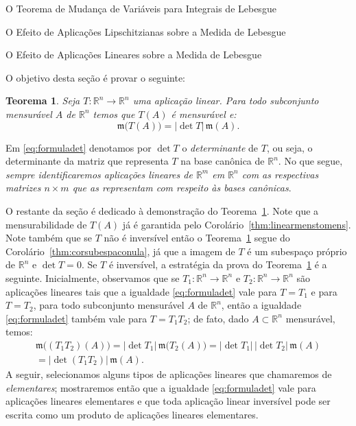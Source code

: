 \documentclass[oneside,final,11pt]{amsbook}
\newcommand{\R}{\mathds R}
\newcommand{\leb}{\mathfrak m}
\theoremstyle{remark}\newtheorem{exercise}{Exercício}[chapter]
\theoremstyle{remark}\newtheorem{*exercise}[exercise]{\hbox to 0pt{\hskip 0pt minus 1fil*}Exercício}
\theoremstyle{definition}\newtheorem{exdefin}{Definição}[chapter]
\theoremstyle{plain}\newtheorem{teo}{Teorema}[section]
\theoremstyle{plain}\newtheorem{lem}[teo]{Lema}
\theoremstyle{plain}\newtheorem{prop}[teo]{Proposição}
\theoremstyle{plain}\newtheorem{cor}[teo]{Corolário}
\theoremstyle{definition}\newtheorem{defin}[teo]{Definição}
\theoremstyle{remark}\newtheorem{rem}[teo]{Observação}
\theoremstyle{definition}\newtheorem{notation}[teo]{Notação}
\theoremstyle{definition}\newtheorem{convention}[teo]{Convenção}
\theoremstyle{definition}\newtheorem{example}[teo]{Exemplo}
\numberwithin{section}{chapter}
\numberwithin{equation}{section}
\begin{document}
\begin{chapter}{O Teorema de Mudança de Variáveis para Integrais de Lebesgue}
\begin{section}{O Efeito de Aplicações Lipschitzianas sobre a Medida de Lebesgue}
\end{section}

\begin{section}{O Efeito de Aplicações Lineares sobre a Medida de Lebesgue}

O objetivo desta seção é provar o seguinte:
\begin{teo}\label{thm:mudvarcasolin}
Seja $T:\R^n\to\R^n$ uma aplicação linear. Para todo subconjunto mensurável $A$ de $\R^n$
temos que $T(A)$ é mensurável e:
\begin{equation}\label{eq:formuladet}
\leb\big(T(A)\big)=\vert\det T\vert\,\leb(A).
\end{equation}
\end{teo}
Em \eqref{eq:formuladet} denotamos por $\det T$ o {\em determinante\/} de $T$, ou seja,
o determinante da matriz que representa $T$ na base canônica de $\R^n$. No que segue, {\em sempre identificaremos
aplicações lineares de $\R^m$ em $\R^n$ com as respectivas matrizes $n\times m$ que as representam com respeito às bases
canônicas}.

O restante da seção é dedicado à demonstração do Teorema~\ref{thm:mudvarcasolin}.
Note que a mensurabilidade de $T(A)$ já é garantida pelo Corolário~\ref{thm:linearmenstomens}.
Note também que se $T$ não é inversível então o Teorema~\ref{thm:mudvarcasolin} segue do Corolário~\ref{thm:corsubespaconula},
já que a imagem de $T$ é um subespaço próprio de $\R^n$ e $\det T=0$.
Se $T$ é inversível, a estratégia da prova
do Teorema~\ref{thm:mudvarcasolin} é a seguinte. Inicialmente, observamos que se $T_1:\R^n\to\R^n$ e $T_2:\R^n\to\R^n$
são aplicações lineares tais que a igualdade \eqref{eq:formuladet} vale para $T=T_1$ e para $T=T_2$, para todo subconjunto
mensurável $A$ de $\R^n$, então a igualdade \eqref{eq:formuladet} também vale para $T=T_1T_2$; de fato, dado $A\subset\R^n$
mensurável, temos:
\begin{multline*}
\leb\big((T_1T_2)(A)\big)=\vert\det T_1\vert\,\leb\big(T_2(A)\big)=\vert\det T_1\vert\,\vert\det T_2\vert\,\leb(A)\\
=\vert\det(T_1T_2)\vert\,\leb(A).
\end{multline*}
A seguir, selecionamos alguns tipos de aplicações lineares que chamaremos de {\em elementares}; mostraremos então
que a igualdade \eqref{eq:formuladet} vale para aplicações lineares elementares e que toda aplicação linear inversível pode
ser escrita como um produto de aplicações lineares elementares.


\end{section}
\end{chapter}
\end{document}

